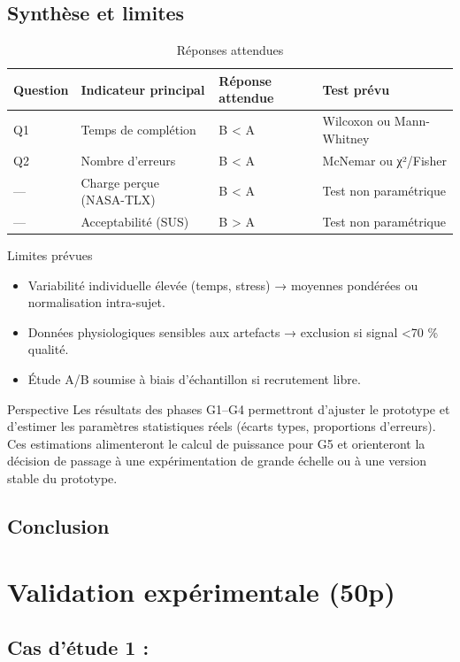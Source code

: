\documentclass[a4paper,12pt]{article}
\begin{document}
\subsection{Synthèse et limites}
\label{sec:orgdb5b4b1}
\begin{table}[htbp]
\caption{\label{tab:org533e867}Réponses attendues}
\centering
\begin{tabular}{llll}
Question & Indicateur principal & Réponse attendue & Test prévu\\
\hline
Q1 & Temps de complétion & B < A & Wilcoxon ou Mann-Whitney\\
Q2 & Nombre d’erreurs & B < A & McNemar ou χ²/Fisher\\
— & Charge perçue (NASA-TLX) & B < A & Test non paramétrique\\
— & Acceptabilité (SUS) & B > A & Test non paramétrique\\
\end{tabular}
\end{table}

Limites prévues
\begin{itemize}
\item Variabilité individuelle élevée (temps, stress) → moyennes pondérées ou normalisation intra-sujet.
\item Données physiologiques sensibles aux artefacts → exclusion si signal <70 \% qualité.
\item Étude A/B soumise à biais d’échantillon si recrutement libre.
\end{itemize}

Perspective
Les résultats des phases G1–G4 permettront d’ajuster le prototype et d’estimer les paramètres statistiques réels (écarts types, proportions d’erreurs).  
Ces estimations alimenteront le calcul de puissance pour G5 et orienteront la décision de passage à une expérimentation de grande échelle ou à une version stable du prototype.
\subsection{Conclusion}
\label{sec:org3448635}
\clearpage
\section{Validation expérimentale (50p)}
\label{sec:org7a9c9fa}
\subsection{Cas d'étude 1 :}
\label{sec:orge9aa253}
\end{document}
